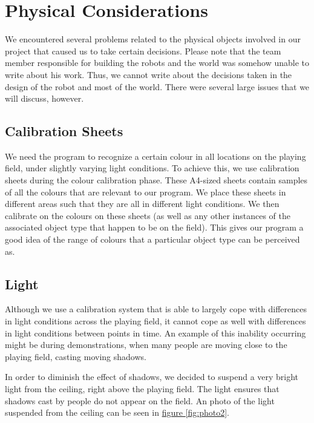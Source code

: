 \documentclass[10pt, abstracton]{scrartcl}
\newcommand{\fref}[1]{\hyperref[#1]{figure \vref{#1}}}
\begin{document}
\section{Physical Considerations}
We encountered several problems related to the physical objects involved in our project that caused us to take certain decisions. Please note that the team member responsible for building the robots and the world was somehow unable to write about his work. Thus, we cannot write about the decisions taken in the design of the robot and most of the world. There were several large issues that we will discuss, however.

\subsection{Calibration Sheets}
We need the program to recognize a certain colour in all locations on the playing field, under slightly varying light conditions. To achieve this, we use calibration sheets during the colour calibration phase. These A4-sized sheets contain samples of all the colours that are relevant to our program. We place these sheets in different areas such that they are all in different light conditions. We then calibrate on the colours on these sheets (as well as any other instances of the associated object type that happen to be on the field). This gives our program a good idea of the range of colours that a particular object type can be perceived as.

\subsection{Light}
Although we use a calibration system that is able to largely cope with differences in light conditions across the playing field, it cannot cope as well with differences in light conditions between points in time. An example of this inability occurring might be during demonstrations, when many people are moving close to the playing field, casting moving shadows.

In order to diminish the effect of shadows, we decided to suspend a very bright light from the ceiling, right above the playing field. The light ensures that shadows cast by people do not appear on the field. An photo of the light suspended from the ceiling can be seen in \fref{fig:photo2}.
\end{document}
